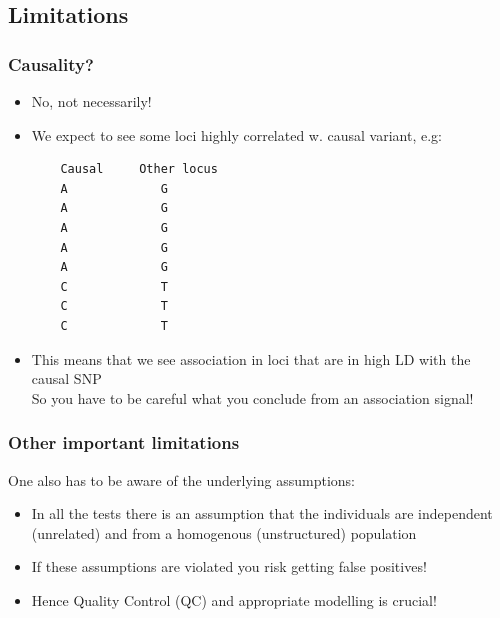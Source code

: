 \documentclass[xcolor=pdftex,dvipsnames,table,10pt]{beamer}
\begin{document}
\subsection{Limitations}
\begin{frame}[fragile]
  \frametitle{Causality?}
  \small 
   \vspace{-.2cm}
  \begin{itemize}
    \item<2-> No, not necessarily!
    \item<3-> We expect to see some loci highly correlated w. causal variant, e.g:\\\vspace{0.2cm}
    \begin{verbatim}
    Causal     Other locus
    A       	  G
    A       	  G
    A       	  G
    A       	  G
    A       	  G
    C       	  T
    C       	  T
    C       	  T
    \end{verbatim}
    \item<4-> This means that we see association in loci that are in high LD with the causal SNP\\
So you have to be careful what you conclude from an association signal!
   \end{itemize}
\end{frame}


\begin{frame}[fragile]
  \frametitle{Other important limitations}
  \small 
 One also has to be aware of the underlying assumptions:
 \begin{itemize}%

    \item<1-> In all the tests there is an assumption that the individuals are independent (unrelated) and from a homogenous (unstructured) population
    \item<2->  If these assumptions are violated you risk getting false positives!
\item<3-> Hence Quality Control (QC) and appropriate modelling is crucial!
   \end{itemize}
\end{frame}
\end{document}
